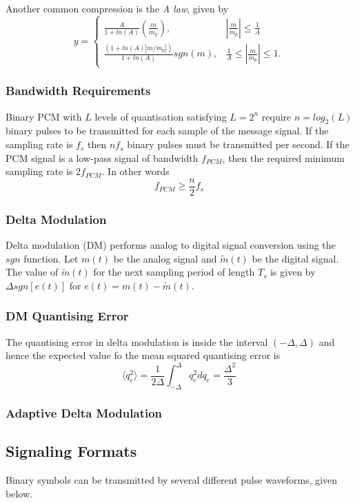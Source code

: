\documentclass[]{article}
\begin{document}
Another common compression is the \textit{A law}, given by
\begin{equation} y=\begin{cases}
\frac{A}{1+ln(A)}( \frac{m}{m_{p}}), & |\frac{m}{m_{p}}|\leq \frac{1}{A}\\
\frac{(1+ln(A)|m/m_{p}|)}{1+ln(A)}sgn(m), & \frac{1}{A}\leq |\frac{m}{m_{p}}|\leq 1.
\end{cases} \end{equation}
\subsubsection{Bandwidth Requirements}
Binary PCM with $L$ levels of quantisation satisfying $L=2^{n}$ require $n = log_{2}(L)$ binary pulses to be transmitted for each sample of the message signal. If the sampling rate is $f_{s}$ then $nf_{s}$ binary pulses must be transmitted per second. If the PCM signal is a low-pass signal of bandwidth $f_{PCM}$, then the required minimum sampling rate is $2f_{PCM}$. In other words
\begin{equation} f_{PCM} \geq \frac{n}{2}f_{s} \end{equation}
\subsubsection{Delta Modulation}
Delta modulation (DM) performs analog to digital signal conversion using the $sgn$ function. Let $m(t)$ be the analog signal and $\tilde{m}(t)$ be the digital signal. The value of $\tilde{m}(t)$ for the next sampling period of length $T_{s}$ is given by $\Delta sgn[e(t)]$ for $e(t) = m(t) - \tilde{m}(t)$.
\subsubsection{DM Quantising Error}
The quantising error in delta modulation is inside the interval $(-\Delta, \Delta)$ and hence the expected value fo the mean squared quantising error is
\begin{equation} \langle q_{e}^{2} \rangle =\frac{1}{2 \Delta} \int_{-\Delta}^{\Delta} q_{e}^{2} dq_{e} = \frac{\Delta^{2}}{3} \end{equation}
\subsubsection{Adaptive Delta Modulation}


\subsection{Signaling Formats}
Binary symbols can be transmitted by several different pulse waveforms, given below.
\end{document}

